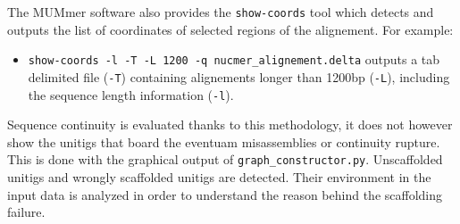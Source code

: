\documentclass[12pt]{article}
\begin{document}
The MUMmer software also provides the \texttt{show-coords} tool which detects and outputs the list of coordinates of selected regions of the alignement. For example:
\begin{itemize}
\item \texttt{show-coords -l -T -L 1200 -q nucmer\_alignement.delta} outputs a tab delimited file (\texttt{-T}) containing alignements longer than 1200bp (\texttt{-L}), including the sequence length information (\texttt{-l}).
\end{itemize}
Sequence continuity is evaluated thanks to this methodology, it does not however show the unitigs that board the eventuam misassemblies or continuity rupture. This is done with the graphical output of \texttt{graph\_constructor.py}. Unscaffolded unitigs and wrongly scaffolded unitigs are detected. Their environment in the input data is analyzed in order to understand the reason behind the scaffolding failure.
\end{document}
